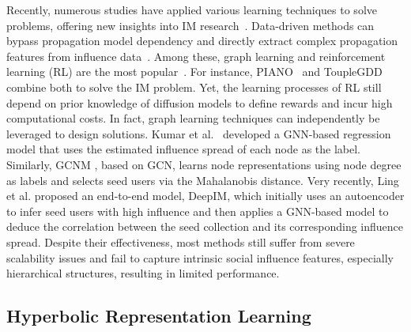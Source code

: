 Recently, numerous studies have applied various learning techniques to solve problems, offering new insights into IM research~\cite{TKDD23_li2023survey}.
Data-driven methods can bypass propagation model dependency and directly extract complex propagation features from influence data~\cite{du2014learn_dif_model, WWW2024-Huang}.
Among these, graph learning and reinforcement learning (RL) are the most popular~\cite{hevapathige2024_DeepSN, tang2024graph, panagopoulos2024learning, feng2024influence, chowdhury2024deep}.
For instance, PIANO~\cite{li2022piano} and ToupleGDD~\cite{chen2023ToupleGDD} combine both to solve the IM problem. 
Yet, the learning processes of RL still depend on prior knowledge of diffusion models to define rewards and incur high computational costs.
In fact, graph learning techniques can independently be leveraged to design solutions.
Kumar et al.~\cite{kumar2022gnn} developed a GNN-based regression model that uses the estimated influence spread of each node as the label. 
Similarly, GCNM \cite{zhang2022GCNM}, based on GCN, learns node representations using node degree as labels and selects seed users via the Mahalanobis distance.
Very recently, Ling et al. \cite{ling2023icml} proposed an end-to-end model, DeepIM, which initially uses an autoencoder to infer seed users with high influence and then applies a GNN-based model to deduce the correlation between the seed collection and its corresponding influence spread.
Despite their effectiveness, most methods still suffer from severe scalability issues and fail to capture intrinsic social influence features, especially hierarchical structures, resulting in limited performance.


\subsection{Hyperbolic Representation Learning}

